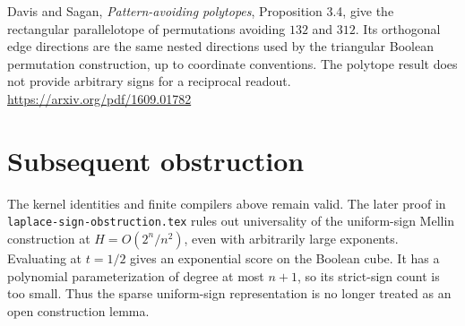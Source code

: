 \documentclass[11pt]{article}
\begin{document}
Davis and Sagan, \emph{Pattern-avoiding polytopes}, Proposition 3.4,
give the rectangular parallelotope of permutations avoiding
$132$ and $312$. Its orthogonal edge directions are the same
nested directions used by the triangular Boolean permutation
construction, up to coordinate conventions. The polytope result
does not provide arbitrary signs for a reciprocal readout.
\url{https://arxiv.org/pdf/1609.01782}

\section{Subsequent obstruction}

The kernel identities and finite compilers above remain valid.
The later proof in \texttt{laplace-sign-obstruction.tex} rules out
universality of the uniform-sign Mellin construction at
$H=O(2^n/n^2)$, even with arbitrarily large exponents. Evaluating
at $t=1/2$ gives an exponential score on the Boolean cube. It has
a polynomial parameterization of degree at most $n+1$, so its
strict-sign count is too small. Thus the sparse uniform-sign
representation is no longer treated as an open construction lemma.
\end{document}
